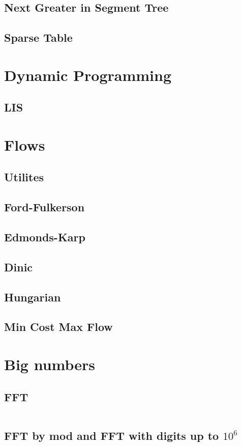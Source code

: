 \subsection{Next Greater in Segment Tree}

\subsection{Sparse Table}



\section{Dynamic Programming}

\subsection{LIS}



\section{Flows}

\subsection{Utilites}

\subsection{Ford-Fulkerson}

\subsection{Edmonds-Karp}

\subsection{Dinic}

\subsection{Hungarian}

\subsection{Min Cost Max Flow}





\section{Big numbers}

\subsection{FFT}
\inputminted[mathescape,tabsize=2]{cpp}{../BigNum/FFT.cpp}
\subsection{FFT by mod and FFT with digits up to $10^6$}
\inputminted[mathescape,tabsize=2]{cpp}{../BigNum/FFT_mod_ll.cpp}
